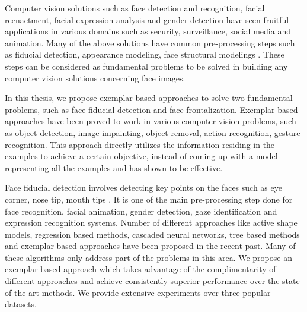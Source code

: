 

Computer vision solutions such as face detection and recognition, facial reenactment, facial expression analysis
and gender detection have seen fruitful applications in various domains such as security, surveillance, social media 
and animation. Many of the above solutions have common pre-processing steps such as fiducial detection, appearance
modeling, face structural modelings \etc. These steps can be considered as fundamental problems to be solved in building any
computer vision solutions concerning face images.


In this thesis, we propose exemplar based approaches to solve two fundamental problems, such as face fiducial 
detection and face frontalization. Exemplar based approaches have been proved 
to work in various computer vision problems, such as object detection, image impainting, 
object removal, action 
recognition, gesture recognition. 
This approach directly utilizes the information residing in the examples to achieve a certain 
objective, instead of coming up with a model representing all the examples and has shown to be effective. 

Face fiducial detection involves detecting key points on the faces such as eye corner, nose tip, mouth tips
\etc. It is one of the main pre-processing step done for face recognition, facial animation, 
gender detection, gaze identification and expression recognition systems.
Number of different approaches like active shape models, regression based 
methods, cascaded neural networks, tree based methods
 and exemplar based approaches have been proposed in the 
recent past. Many of these algorithms only address part of the problems in this area. We propose an 
exemplar based approach which takes advantage of the complimentarity of different approaches and achieve
consistently superior performance over the state-of-the-art methods. We provide extensive experiments 
over three popular datasets.

